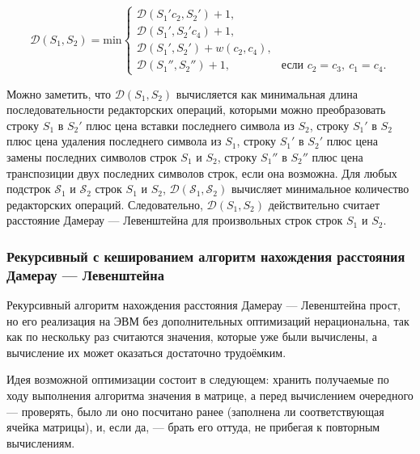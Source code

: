 \begin{enumerate}
$$    \mathcal{D}(S_1, S_2) = \mathrm{min} \begin{cases}
        \mathcal{D}(S_1'c_2, S_2') + 1, \\
        \mathcal{D}(S_1', S_2'c_4) + 1, \\
        \mathcal{D}(S_1', S_2') + w(c_2, c_4), \\
        \mathcal{D}(S_1'', S_2'') + 1,\ &\text{если $c_2 = c_3,\ c_1 = c_4$}.
    \end{cases}
        $$
\end{enumerate}

Можно заметить, что $\mathcal{D}(S_1, S_2)$ вычисляется как минимальная длина последовательности редакторских операций, которыми можно преобразовать строку $S_1$ в $S_2'$ плюс цена вставки последнего символа из $S_2$, строку $S_1'$ в $S_2$ плюс цена удаления последнего символа из $S_1$, строку $S_1'$ в $S_2'$ плюс цена замены последних символов строк $S_1$ и $S_2$, строку $S_1''$ в $S_2''$ плюс цена транспозиции двух последних символов строк, если она возможна.
Для любых подстрок $\mathcal{S}_1$ и $\mathcal{S}_2$ строк $S_1$ и $S_2$, $\mathcal{D}(\mathcal{S}_1, \mathcal{S}_2)$ вычисляет минимальное количество редакторских операций.
Следовательно, $\mathcal{D}(S_1, S_2)$ действительно считает расстояние Дамерау --- Левенштейна для произвольных строк строк $S_1$ и $S_2$.

\subsubsection{Рекурсивный с кешированием алгоритм нахождения расстояния Дамерау --- Левенштейна}

Рекурсивный алгоритм нахождения расстояния Дамерау --- Левенштейна прост, но его реализация на ЭВМ без дополнительных оптимизаций нерациональна, так как по нескольку раз считаются значения, которые уже были вычислены, а вычисление их может оказаться достаточно трудоёмким.

Идея возможной оптимизации состоит в следующем: хранить получаемые по ходу выполнения алгоритма значения в матрице, а перед вычислением очередного --- проверять, было ли оно посчитано ранее (заполнена ли соответствующая ячейка матрицы), и, если да, --- брать его оттуда, не прибегая к повторным вычислениям.

